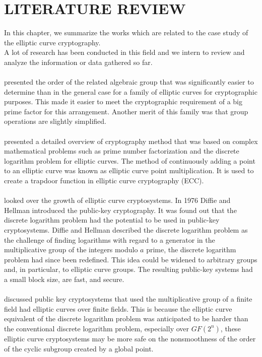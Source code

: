 \chapter{LITERATURE REVIEW}
In this chapter, we summarize the works which are related to the case study of the elliptic curve cryptography.\\ 
A lot of research has been conducted in this field and we intern to review and analyze the information or data gathered so far.\\\\
\cite{Narayan2018} presented the order of the related algebraic group that was significantly easier to determine than in the general case for a family of elliptic curves for cryptographic purposes. This made it easier to meet the cryptographic requirement of a big prime factor for this arrangement. Another merit of this family was that group operations are slightly simplified.\\\\
\cite{Narayan2018a} presented a detailed overview of cryptography method that was based on complex mathematical problems such as prime number factorization and the discrete logarithm problem for elliptic curves. The method of continuously adding a point to an elliptic curve was known as elliptic curve point multiplication. It is used to create a trapdoor function in elliptic curve cryptography (ECC).\\\\
\cite{Koblitz2000} looked over the growth of elliptic curve cryptosystems. In 1976 Diffie and Hellman introduced the public-key cryptography. It was found out that the discrete logarithm problem had the potential to be used in public-key cryptosystems. Diffie and Hellman described the discrete logarithm problem as the challenge of finding logarithms with regard to a generator in the multiplicative group of the integers modulo $a$ prime, the discrete logarithm problem had since been redefined. This idea could be widened to arbitrary groups and, in particular, to elliptic curve groups. The resulting public-key systems had a small block size, are fast, and secure.\\\\
\cite{Koblitz1987} discussed public key cryptosystems that used the multiplicative group of a finite field had elliptic curves over finite fields. This is because the elliptic curve equivalent of the discrete logarithm problem was anticipated to be harder than the conventional discrete logarithm problem, especially over $GF(2^{n})$, these elliptic curve cryptosystems may be more safe on the nonsmoothness of the order of the cyclic subgroup created by a global point.\\\\
